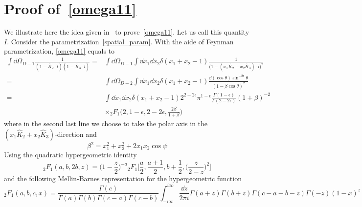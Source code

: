 \section{Proof of~\cref{omega11}}\label{appendix-omega11}
We illustrate here the idea given in~\cite{Somogyi:2011ir} to prove~\cref{omega11}.
Let us call this quantity $I$.
Consider the parametrization~\cref{spatial_param}.
With the aide of Feynman parametrization, \cref{omega11} equals to
\begin{equation}\label{omega11i}
\begin{split}
\int\dd\Omega_{D-1}\frac{1}{(1-\hat{K}_2\cdot\hat{l})(1-\hat{K}_3\cdot\hat{l})}
= &
\int\dd\Omega_{D-1}\int\dd x_1\dd x_2\delta(x_1+x_2-1)\frac{1}{\big(1-(x_1\hat{K}_2 + x_2\hat{K}_3)\cdot\hat{l}
\big)^2}
\\
=&
\int\dd\Omega_{D-2}\int\dd x_1\dd x_2\delta(x_1+x_2-1)
\frac{\dd(\cos\theta) \sin^{-2\epsilon}\theta}{(1-\beta\cos\theta)^2}
\\
=&
\int\dd x_1\dd x_2 \delta(x_1+x_2-1)2^{2-2\epsilon}\pi^{1-\epsilon}\frac{\Gamma(1-\epsilon)}{\Gamma(2-2\epsilon)}(1+\beta)^{-2}
\\
& \times
{}_2F_1\big(2,1-\epsilon, 2-2\epsilon,\frac{2\beta}{1+\beta}\big)
\end{split}
\end{equation}
where in the second last line we choose to take the polar axis in the $(x_1\hat{K}_2 + x_2\hat{K}_3)$-direction and
\begin{equation}
\beta^2 = x_1^2 + x_2^2 + 2x_1x_2\cos\psi
\end{equation}
%
%
%
\iffalse %
\begin{equation}
\frac{1}{(x+y)^\lambda} = \frac{1}{\Gamma(\lambda)}
\frac{1}{2\pi i}\int^{i\infty}_{-i\infty}\dd z \Gamma(\lambda + z)\Gamma(-z)\frac{y^z}{x^{\lambda+z}}
\end{equation}
to write the above equation as
\fi %
%
%
%
Using the quadratic hypergeometric identity
\begin{equation}
{}_2F_1(a,b,2b,z)=\big(1-\frac{z}{2}\big)^{-a}{}_2F_1\big[\frac{a}{2},\frac{a+1}{2}, b+\frac{1}{2}, \big(\frac{z}{2-z}\big)^2\big]
\end{equation}
and the following Mellin-Barnes representation for the hypergeometric function
\begin{equation}
{}_2F_1(a,b,c,x) = \frac{\Gamma(c)}{\Gamma(a)\Gamma(b)\Gamma(c-a)\Gamma(c-b)}\int_{-i\infty}^{i\infty}\frac{\dd z}{2\pi i}\Gamma(a+z)\Gamma(b+z)\Gamma(c-a-b-z)\Gamma(-z)(1-x)^z
\end{equation}
